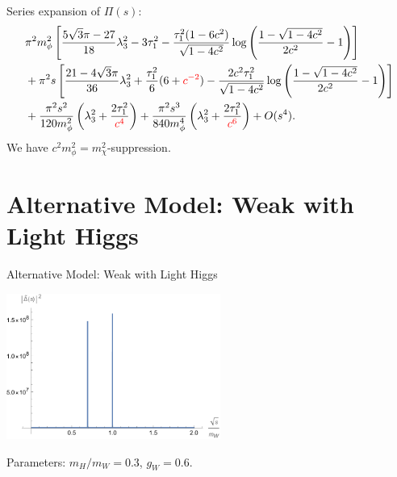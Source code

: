 \documentclass[10pt]{beamer}
\begin{document}
	\begin{frame}
		Series expansion of $\Pi(s)$:
		\begin{align*}
			&\pi^{2}m_{\phi}^{2}\left[\frac{5\sqrt{3}\pi-27}{18}\lambda_{3}^2-3\tau_{1}^{2}-\frac{\tau_{1}^{2}(1-6c^{2})}{\sqrt{1-4c^{2}}}\log\left(\frac{1-\sqrt{1-4c^{2}}}{2c^{2}}-1\right)\right]\\
			&+\pi^{2}s\left[\frac{21-4\sqrt{3}\pi}{36}\lambda_{3}^{2}+\frac{\tau_{1}^{2}}{6}(6+\color{red}c^{-2}\color{black})-\frac{2c^{2}\tau_{1}^{2}}{\sqrt{1-4c^{2}}}\log\left(\frac{1-\sqrt{1-4c^{2}}}{2c^{2}}-1\right)\right]\\
			&+\frac{\pi^{2}s^{2}}{120m_{\phi}^{2}}\left(\lambda_{3}^{2}+\frac{2\tau_{1}^{2}}{\color{red}c^{4}\color{black}}\right)+\frac{\pi^{2}s^{3}}{840m_{\phi}^{4}}\left(\lambda_{3}^{2}+\frac{2\tau_{1}^{2}}{\color{red}c^{6}\color{black}}\right)+O(s^{4}).
		\end{align*}
		We have $c^{2}m_{\phi}^{2}=m_{\chi}^{2}$-suppression.
	\end{frame}
	
	\section{Alternative Model: Weak with Light Higgs}
	\begin{frame}{Alternative Model: Weak with Light Higgs}
		\begin{center}
			\includegraphics[width=7cm]{resonance3.pdf}
		\end{center}
		Parameters: $m_{H}/m_{W}=0.3$, $g_{W}=0.6$.
	\end{frame}
\end{document}
